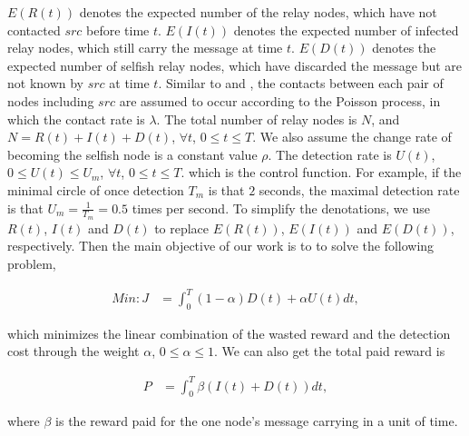 $E(R(t))$ denotes the expected number of the relay nodes,
which have not contacted $src$ before time $t$.
$E(I(t))$ denotes the expected number of infected relay nodes,
which still carry the message at time $t$.
$E(D(t))$ denotes the expected number of selfish relay nodes,
which have discarded the message but are not known by $src$
at time $t$.
Similar to \cite{DBLP:journals/tcss/WuDH18} and \cite{CC2007PerfAnaly},
the contacts between each pair of nodes including $src$
are assumed to occur according to the Poisson process,
in which the contact rate is $\lambda$.
The total number of relay nodes is $N$,
and $N=R(t)+I(t)+D(t)$, $\forall t$, $0 \le t \le T$.
We also assume the change rate of
becoming the selfish node is a constant value $\rho$.
The detection rate is $U(t)$,
$0 \le U(t) \le U_{m}$, $\forall t$, $0 \le t \le T$.
which is the control function.
For example, if the minimal circle of once detection $T_{m}$ is that $2$ seconds,
the maximal detection rate is that $U_{m} = \frac{1}{T_{m}} = 0.5$ times per second.
To simplify the denotations,
we use $R(t)$, $I(t)$ and $D(t)$ to
replace $E(R(t))$, $E(I(t))$ and $E(D(t))$,
respectively.
Then the main objective of our work is to
to solve the following problem,
\begin{small}
\begin{equation}
\label{eq:obj}
\begin{aligned}
Min: J &= \int_{0}^{T} (1-\alpha) D(t) + \alpha U(t) dt ,
\end{aligned}
\end{equation}
\end{small}
which minimizes the linear combination of
the wasted reward and the detection cost through the weight $\alpha$, $0 \le \alpha \le 1$.
We can also get the total paid reward is
\begin{small}
\begin{equation}
\label{eq:reward}
\begin{aligned}
P &= \int_{0}^{T} \beta ( I(t) + D(t) )dt,
\end{aligned}
\end{equation}
\end{small}
where $\beta$ is the reward paid for the one node's message carrying in a unit of time.
